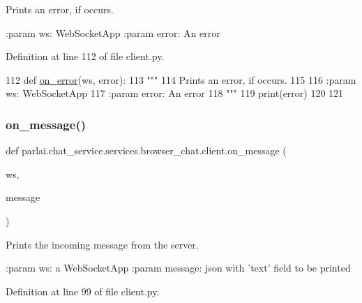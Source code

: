 \begin{DoxyVerb}Prints an error, if occurs.

:param ws: WebSocketApp
:param error: An error
\end{DoxyVerb}
 

Definition at line 112 of file client.\+py.


\begin{DoxyCode}
112 \textcolor{keyword}{def }\hyperlink{namespaceparlai_1_1chat__service_1_1services_1_1terminal__chat_1_1client_a261a307d930994b292f713c0fafbb575}{on\_error}(ws, error):
113     \textcolor{stringliteral}{"""}
114 \textcolor{stringliteral}{    Prints an error, if occurs.}
115 \textcolor{stringliteral}{}
116 \textcolor{stringliteral}{    :param ws: WebSocketApp}
117 \textcolor{stringliteral}{    :param error: An error}
118 \textcolor{stringliteral}{    """}
119     print(error)
120 
121 
\end{DoxyCode}
\mbox{\label{namespaceparlai_1_1chat__service_1_1services_1_1browser__chat_1_1client_a0549c0132c2d2eee08eed3e4bbcb7def}} 
\subsubsection{\texorpdfstring{on\+\_\+message()}{on\_message()}}
{\footnotesize\ttfamily def parlai.\+chat\+\_\+service.\+services.\+browser\+\_\+chat.\+client.\+on\+\_\+message (\begin{DoxyParamCaption}\item[{}]{ws,  }\item[{}]{message }\end{DoxyParamCaption})}

\begin{DoxyVerb}Prints the incoming message from the server.

:param ws: a WebSocketApp
:param message: json with 'text' field to be printed
\end{DoxyVerb}
 

Definition at line 99 of file client.\+py.


